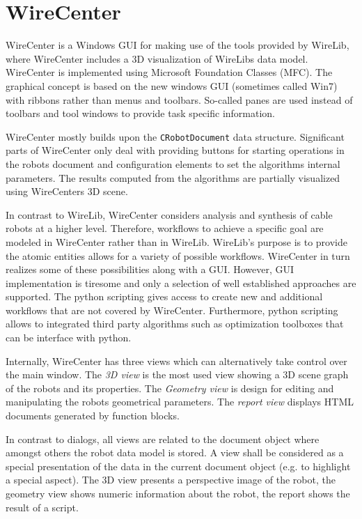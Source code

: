 \documentclass[11pt,a4paper,onepage,openany]{book}
\begin{document}
\section{WireCenter}
WireCenter is a Windows GUI for making use of the tools provided by WireLib,
where WireCenter includes a 3D visualization of WireLibs data model. WireCenter
is implemented using Microsoft Foundation Classes (MFC). The graphical concept
is based on the new windows GUI (sometimes called Win7) with ribbons rather
than menus and toolbars. So-called panes are used instead of toolbars and tool
windows to provide task specific information.

WireCenter mostly builds upon the \texttt{CRobotDocument} data structure.
Significant parts of WireCenter only deal with providing buttons for starting
operations in the robots document and configuration elements to set the
algorithms internal parameters. The results computed from the algorithms are
partially visualized using WireCenters 3D scene.

In contrast to WireLib, WireCenter considers analysis and synthesis of cable
robots at a higher level. Therefore, workflows to achieve a specific goal are
modeled in WireCenter rather than in WireLib. WireLib's purpose is to provide
the atomic entities allows for a variety of possible workflows. WireCenter in
turn realizes some of these possibilities along with a GUI. However, GUI
implementation is tiresome and only a selection of well established approaches
are supported. The python scripting gives access to create new and additional
workflows that are not covered by WireCenter. Furthermore, python scripting
allows to integrated third party algorithms such as optimization toolboxes that
can be interface with python.

Internally, WireCenter has three views which can alternatively take control
over the main window. The \emph{3D view} is the most used view showing a 3D
scene graph of the robots and its properties. The \emph{Geometry view} is
design for editing and manipulating the robots geometrical parameters. The
\emph{report view} displays HTML documents generated by function blocks.

In contrast to dialogs, all views are related to the document object where
amongst others the robot data model is stored. A view shall be considered as a
special presentation of the data in the current document object (e.g. to
highlight a special aspect). The 3D view presents a perspective image of the
robot, the geometry view shows numeric information about the robot, the report
shows the result of a script.
\end{document}
